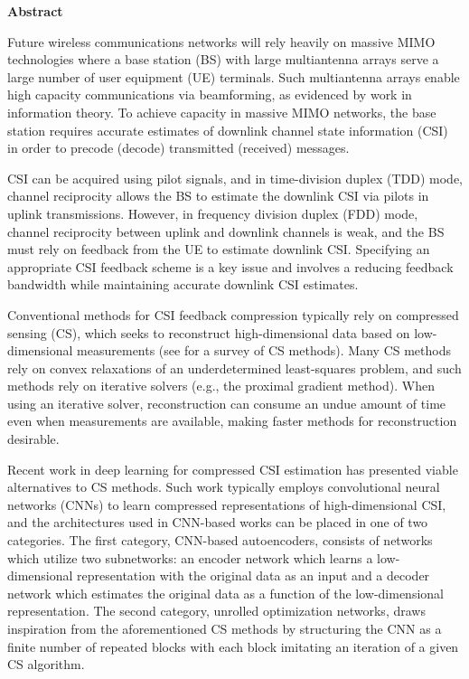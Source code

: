\newpage
{\baselineskip 14pt   } \vspace{27pt}
\centerline{\Huge \bf {Abstract}} \vspace{18pt}

Future wireless communications networks will rely heavily on massive MIMO technologies where a base station (BS) with large multiantenna arrays serve a large number of user equipment (UE) terminals. Such multiantenna arrays enable high capacity communications via beamforming, as evidenced by work in information theory. To achieve capacity in massive MIMO networks, the base station requires accurate estimates of downlink channel state information (CSI) in order to precode (decode) transmitted (received) messages.

CSI can be acquired using pilot signals, and in time-division duplex (TDD) mode, channel reciprocity allows the BS to estimate the downlink CSI via pilots in uplink transmissions. However, in frequency division duplex (FDD) mode, channel reciprocity between uplink and downlink channels is weak, and the BS must rely on feedback from the UE to estimate downlink CSI. Specifying an appropriate CSI feedback scheme is a key issue and involves a reducing feedback bandwidth while maintaining accurate downlink CSI estimates.

Conventional methods for CSI feedback compression typically rely on compressed sensing (CS), which seeks to reconstruct high-dimensional data based on low-dimensional measurements (see for a survey of CS methods). Many CS methods rely on convex relaxations of an underdetermined least-squares problem, and such methods rely on iterative solvers (e.g., the proximal gradient method). When using an iterative solver, reconstruction can consume an undue amount of time even when measurements are available, making faster methods for reconstruction desirable.

Recent work in deep learning for compressed CSI estimation has presented viable alternatives to CS methods. Such work typically employs convolutional neural networks (CNNs) to learn compressed representations of high-dimensional CSI, and the architectures used in CNN-based works can be placed in one of two categories. The first category, CNN-based autoencoders, consists of networks which utilize two subnetworks: an encoder network which learns a low-dimensional representation with the original data as an input and a decoder network which estimates the original data as a function of the low-dimensional representation. The second category, unrolled optimization networks, draws inspiration from the aforementioned CS methods by structuring the CNN as a finite number of repeated blocks with each block imitating an iteration of a given CS algorithm.

